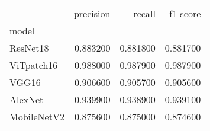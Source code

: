 \begin{tabular}{lrrr}
\toprule
 & precision & recall & f1-score \\
model &  &  &  \\
\midrule
ResNet18 & 0.883200 & 0.881800 & 0.881700 \\
ViTpatch16 & 0.988000 & 0.987900 & 0.987900 \\
VGG16 & 0.906600 & 0.905700 & 0.905600 \\
AlexNet & 0.939900 & 0.938900 & 0.939100 \\
MobileNetV2 & 0.875600 & 0.875000 & 0.874600 \\
\bottomrule
\end{tabular}
